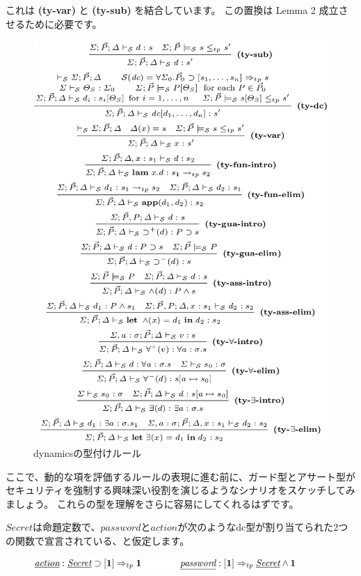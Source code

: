 \documentclass[submit,techreq,noauthor,onecolumn]{ipsj}
\begin{document}
\noindent これは {\bf (ty-var)} と {\bf (ty-sub)} を結合しています。
この置換は Lemma 2 成立させるために必要です。

\begin{figure}[h]
\centering
\includegraphics[width=12cm]{img/fig5_typingrules_dynamics.png}
\caption{dynamicsの型付けルール}
\label{fig:fig5_typingrules_dynamics}
\end{figure}

ここで、動的な項を評価するルールの表現に進む前に、ガード型とアサート型がセキュリティを強制する興味深い役割を演じるようなシナリオをスケッチしてみましょう。
これらの型を理解をさらに容易にしてくれるはずです。

\underline{$Secret$}は命題定数で、\underline{$password$}と\underline{$action$}が次のようなdc型が割り当てられた2つの関数で宣言されている、と仮定します。

\begin{figure}[h]
\centering
\includegraphics[width=10cm]{img/infig22_example2.png}
\end{figure}
\end{document}
